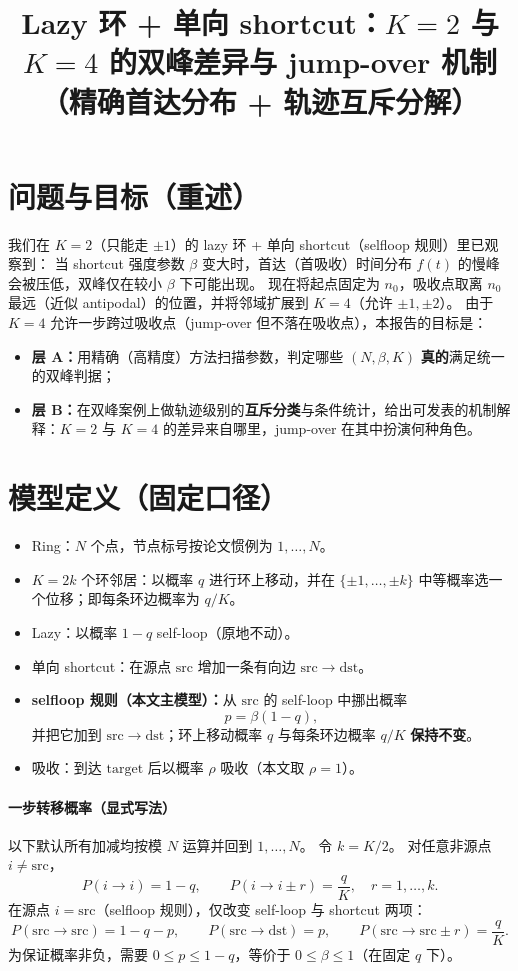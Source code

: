 \documentclass[11pt,fontset=fandol]{ctexart}
\title{Lazy 环 + 单向 shortcut：$K=2$ 与 $K=4$ 的双峰差异与 jump-over 机制\\（精确首达分布 + 轨迹互斥分解）}
\author{}
\date{}
\begin{document}
\maketitle

\section{问题与目标（重述）}
我们在 $K=2$（只能走 $\pm1$）的 lazy 环 + 单向 shortcut（selfloop 规则）里已观察到：
当 shortcut 强度参数 $\beta$ 变大时，首达（首吸收）时间分布 $f(t)$ 的慢峰会被压低，双峰仅在较小 $\beta$ 下可能出现。
现在将起点固定为 $n_0$，吸收点取离 $n_0$ 最远（近似 antipodal）的位置，并将邻域扩展到 $K=4$（允许 $\pm1,\pm2$）。
由于 $K=4$ 允许一步跨过吸收点（jump-over 但不落在吸收点），本报告的目标是：
\begin{itemize}
  \item \textbf{层 A：}用精确（高精度）方法扫描参数，判定哪些 $(N,\beta,K)$ \textbf{真的}满足统一的双峰判据；
  \item \textbf{层 B：}在双峰案例上做轨迹级别的\textbf{互斥分类}与条件统计，给出可发表的机制解释：$K=2$ 与 $K=4$ 的差异来自哪里，jump-over 在其中扮演何种角色。
\end{itemize}

\section{模型定义（固定口径）}
\begin{itemize}
  \item Ring：$N$ 个点，节点标号按论文惯例为 $1,\dots,N$。
  \item $K=2k$ 个环邻居：以概率 $q$ 进行环上移动，并在 $\{\pm1,\dots,\pm k\}$ 中等概率选一个位移；即每条环边概率为 $q/K$。
  \item Lazy：以概率 $1-q$ self-loop（原地不动）。
  \item 单向 shortcut：在源点 $\mathrm{src}$ 增加一条有向边 $\mathrm{src}\to\mathrm{dst}$。
  \item \textbf{selfloop 规则（本文主模型）：}从 $\mathrm{src}$ 的 self-loop 中挪出概率
  \[
    p=\beta(1-q),
  \]
  并把它加到 $\mathrm{src}\to\mathrm{dst}$；环上移动概率 $q$ 与每条环边概率 $q/K$ \textbf{保持不变}。
  \item 吸收：到达 $\mathrm{target}$ 后以概率 $\rho$ 吸收（本文取 $\rho=1$）。
\end{itemize}

\paragraph{一步转移概率（显式写法）}
以下默认所有加减均按模 $N$ 运算并回到 $1,\dots,N$。
令 $k=K/2$。
对任意非源点 $i\neq \mathrm{src}$，
\[
P(i\to i)=1-q,\qquad
P(i\to i\pm r)=\frac{q}{K},\quad r=1,\dots,k.
\]
在源点 $i=\mathrm{src}$（selfloop 规则），仅改变 self-loop 与 shortcut 两项：
\[
P(\mathrm{src}\to\mathrm{src})=1-q-p,\qquad
P(\mathrm{src}\to\mathrm{dst})=p,\qquad
P(\mathrm{src}\to\mathrm{src}\pm r)=\frac{q}{K}.
\]
为保证概率非负，需要 $0\le p\le 1-q$，等价于 $0\le \beta\le 1$（在固定 $q$ 下）。
\end{document}
